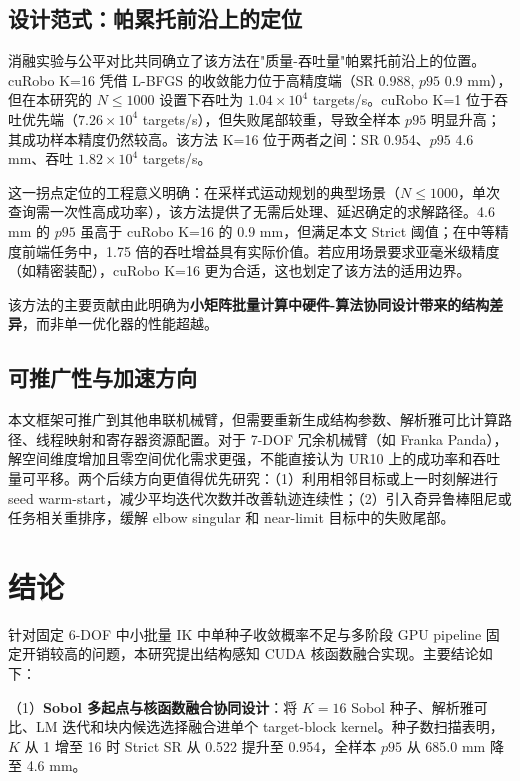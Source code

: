 \documentclass[twocolumn,a4paper,10pt]{ctexart}
\begin{document}
\subsection{设计范式：帕累托前沿上的定位}

消融实验与公平对比共同确立了该方法在"质量-吞吐量"帕累托前沿上的位置。cuRobo K=16 凭借 L-BFGS 的收敛能力位于高精度端（SR 0.988, $p95$ 0.9 mm），但在本研究的 $N\le1000$ 设置下吞吐为 $1.04\times10^4$ targets/s。cuRobo K=1 位于吞吐优先端（$7.26\times10^4$ targets/s），但失败尾部较重，导致全样本 $p95$ 明显升高；其成功样本精度仍然较高。该方法 K=16 位于两者之间：SR 0.954、$p95$ 4.6 mm、吞吐 $1.82\times10^4$ targets/s。

这一拐点定位的工程意义明确：在采样式运动规划的典型场景（$N\le1000$，单次查询需一次性高成功率），该方法提供了无需后处理、延迟确定的求解路径。4.6 mm 的 $p95$ 虽高于 cuRobo K=16 的 0.9 mm，但满足本文 Strict 阈值；在中等精度前端任务中，1.75 倍的吞吐增益具有实际价值。若应用场景要求亚毫米级精度（如精密装配），cuRobo K=16 更为合适，这也划定了该方法的适用边界。

该方法的主要贡献由此明确为\textbf{小矩阵批量计算中硬件-算法协同设计带来的结构差异}，而非单一优化器的性能超越。

\subsection{可推广性与加速方向}

本文框架可推广到其他串联机械臂，但需要重新生成结构参数、解析雅可比计算路径、线程映射和寄存器资源配置。对于 7-DOF 冗余机械臂（如 Franka Panda\cite{moveit}），解空间维度增加且零空间优化需求更强，不能直接认为 UR10 上的成功率和吞吐量可平移。两个后续方向更值得优先研究：（1）利用相邻目标或上一时刻解进行 seed warm-start，减少平均迭代次数并改善轨迹连续性；（2）引入奇异鲁棒阻尼或任务相关重排序，缓解 elbow singular 和 near-limit 目标中的失败尾部。

\FloatBarrier
\section{结论}

针对固定 6-DOF 中小批量 IK 中单种子收敛概率不足与多阶段 GPU pipeline 固定开销较高的问题，本研究提出结构感知 CUDA 核函数融合实现。主要结论如下：

（1）\textbf{Sobol 多起点与核函数融合协同设计}：将 $K=16$ Sobol 种子、解析雅可比、LM 迭代和块内候选选择融合进单个 target-block kernel。种子数扫描表明，$K$ 从 1 增至 16 时 Strict SR 从 0.522 提升至 0.954，全样本 $p95$ 从 685.0 mm 降至 4.6 mm。
\end{document}
